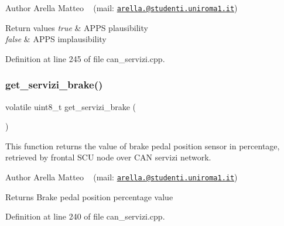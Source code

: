 \begin{DoxyAuthor}{Author}
Arella Matteo ~\newline
 (mail\+: \href{mailto:arella.1646983@studenti.uniroma1.it}{\tt arella.@studenti.\+uniroma1.\+it})
\end{DoxyAuthor}

\begin{DoxyRetVals}{Return values}
{\em true} & A\+P\+PS plausibility \\
\hline
{\em false} & A\+P\+PS implausibility \\
\hline
\end{DoxyRetVals}


Definition at line 245 of file can\+\_\+servizi.\+cpp.

\mbox{\label{group___c_a_n__servizi__group_ga21c09880bef645f24962658ef3dbb16e}} 
\subsubsection{\texorpdfstring{get\+\_\+servizi\+\_\+brake()}{get\_servizi\_brake()}}
{\footnotesize\ttfamily volatile uint8\+\_\+t get\+\_\+servizi\+\_\+brake (\begin{DoxyParamCaption}{ }\end{DoxyParamCaption})}



This function returns the value of brake pedal position sensor in percentage, retrieved by frontal S\+CU node over C\+AN servizi network. 

\begin{DoxyAuthor}{Author}
Arella Matteo ~\newline
 (mail\+: \href{mailto:arella.1646983@studenti.uniroma1.it}{\tt arella.@studenti.\+uniroma1.\+it})
\end{DoxyAuthor}
\begin{DoxyReturn}{Returns}
Brake pedal position percentage value 
\end{DoxyReturn}


Definition at line 240 of file can\+\_\+servizi.\+cpp.

\mbox{\label{group___c_a_n__servizi__group_ga064fdc5f825b2d50b1b13509e3f135d2}} 
